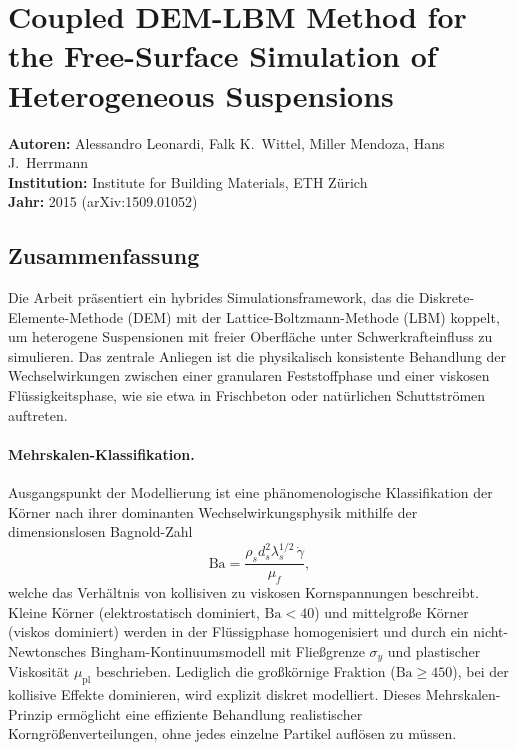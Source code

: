 \documentclass[a4paper,12pt]{article}
\begin{document}
\section*{Coupled DEM-LBM Method for the Free-Surface Simulation of
Heterogeneous Suspensions}

\textbf{Autoren:} Alessandro Leonardi, Falk K.\ Wittel, Miller Mendoza,
Hans J.\ Herrmann\\
\textbf{Institution:} Institute for Building Materials, ETH Zürich\\
\textbf{Jahr:} 2015 (arXiv:1509.01052)

\subsection*{Zusammenfassung}

Die Arbeit präsentiert ein hybrides Simulationsframework, das die Diskrete-Elemente-Methode (DEM) mit der Lattice-Boltzmann-Methode (LBM) koppelt, um heterogene Suspensionen mit freier Oberfläche unter Schwerkrafteinfluss zu simulieren. Das zentrale Anliegen ist die physikalisch konsistente Behandlung der Wechselwirkungen zwischen einer granularen Feststoffphase und einer viskosen Flüssigkeitsphase, wie sie etwa in Frischbeton oder natürlichen Schuttströmen auftreten.

\paragraph{Mehrskalen-Klassifikation.}
Ausgangspunkt der Modellierung ist eine phänomenologische Klassifikation der Körner nach ihrer dominanten Wechselwirkungsphysik mithilfe der dimensionslosen Bagnold-Zahl
\begin{equation}
    \mathrm{Ba} = \frac{\rho_s d_s^2 \lambda_s^{1/2}\,\dot{\gamma}}{\mu_f},
\end{equation}
welche das Verhältnis von kollisiven zu viskosen Kornspannungen beschreibt.
Kleine Körner (elektrostatisch dominiert, $\mathrm{Ba} < 40$) und mittelgroße
Körner (viskos dominiert) werden in der Flüssigphase homogenisiert und durch
ein nicht-Newtonsches Bingham-Kontinuumsmodell mit Fließgrenze $\sigma_y$ und
plastischer Viskosität $\mu_\mathrm{pl}$ beschrieben. Lediglich die
großkörnige Fraktion ($\mathrm{Ba} \geq 450$), bei der kollisive Effekte
dominieren, wird explizit diskret modelliert. Dieses Mehrskalen-Prinzip
ermöglicht eine effiziente Behandlung realistischer Korngrößenverteilungen,
ohne jedes einzelne Partikel auflösen zu müssen.
\end{document}
